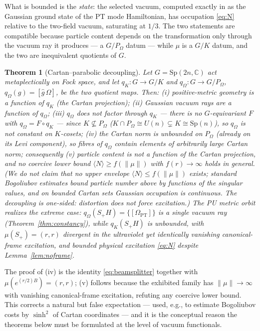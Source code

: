 \documentclass[11pt]{article}
\newtheorem{theorem}{Theorem}[section]
\theoremstyle{definition}
\theoremstyle{remark}
\newcommand{\C}{\mathbb{C}}
\newcommand{\Sp}{\mathrm{Sp}}
\begin{document}
What is bounded is the \emph{state}: the selected vacuum, computed exactly
in \cite{companion2} as the Gaussian ground state of the PT mode
Hamiltonian, has occupation \eqref{eq:N} relative to the two-field vacuum,
saturating at $1/3$.  The two statements are compatible because particle
content depends on the transformation only through the vacuum ray it
produces --- a $G/P_\Omega$ datum --- while $\mu$ is a $G/K$ datum, and
the two are inequivalent quotients of $G$.

\begin{theorem}[Cartan--parabolic decoupling]\label{thm:decoupling}
Let $G=\Sp(2n,\C)$ act metaplectically on Fock space, and let
$q_K:G\to G/K$ and $q_\Omega:G\to G/P_\Omega$,
$q_\Omega(g)=[\hat g\,\Omega]$, be the two quotient maps.  Then:
(i) positive-metric geometry is a function of $q_K$ (the Cartan
projection); (ii) Gaussian vacuum rays are a function of $q_\Omega$;
(iii) $q_\Omega$ does not factor through $q_K$ --- there is no
$G$-equivariant $F$ with $q_\Omega=F\circ q_K$ --- since
$K\not\subseteq P_\Omega$ ($K\cap P_\Omega\cong U(n)\subsetneq
K\cong\Sp(n)$), so $q_\Omega$ is not constant on $K$-cosets; (iv) the
Cartan norm is unbounded on $P_\Omega$ (already
on its Levi component), so fibres of $q_\Omega$ contain elements of
arbitrarily large Cartan norm; consequently (v) particle content is not
a function of the Cartan projection, and no coercive lower bound
$\langle N\rangle\ge f(\|\mu\|)$ with $f(r)\to\infty$ holds in general.
(We do \emph{not} claim that no upper envelope
$\langle N\rangle\le f(\|\mu\|)$ exists; standard Bogoliubov estimates
bound particle number above by functions of the singular values, and on
bounded Cartan sets Gaussian occupation is continuous.  The decoupling
is one-sided: distortion does not \emph{force} excitation.)
The PU metric orbit realizes the extreme case:
$q_\Omega(S_+H)=\{[\Omega_{\mathrm{PT}}]\}$ is a single vacuum ray
(Theorem~\ref{thm:constancy}), while $q_K(S_+H)$ is unbounded, with
$\mu(S_+)=(r,r)$ divergent in the ultraviolet yet identically vanishing
canonical-frame excitation, and bounded physical excitation \eqref{eq:N}
despite Lemma~\ref{lem:noframe}.
\end{theorem}

The proof of (iv) is the identity \eqref{eq:beamsplitter} together with
$\mu(e^{(r/2)B})=(r,r)$; (v) follows because the exhibited family has
$\|\mu\|\to\infty$ with vanishing canonical-frame excitation, refuting
any coercive lower bound.  This corrects a natural but false expectation
--- used, e.g., to estimate Bogoliubov costs by $\sinh^2$ of Cartan
coordinates --- and it is the conceptual reason the theorems below must
be formulated at the level of vacuum functionals.
\end{document}
